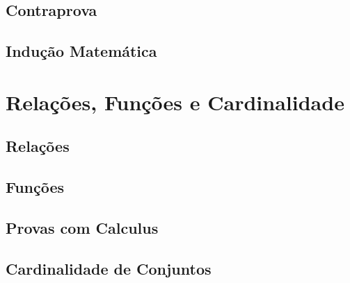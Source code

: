 \documentclass[a4paper,11pt]{book}
\theoremstyle{definition}
\begin{document}
\chapter{Contraprova}

\chapter{Indução Matemática}


\part{Relações, Funções e Cardinalidade}

\chapter{Relações}

\chapter{Funções}

\chapter{Provas com Calculus}

\chapter{Cardinalidade de Conjuntos}
\end{document}
